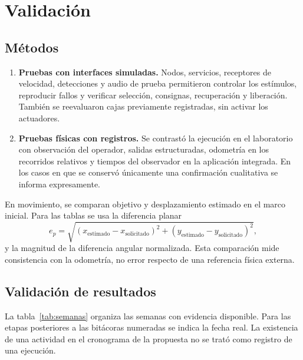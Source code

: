 \documentclass[11pt,letterpaper]{article}
\begin{document}
\FloatBarrier
\clearpage
\section{Validación}\label{sec:validacion}
\subsection{Métodos}
\begin{enumerate}
\item \textbf{Pruebas con interfaces simuladas.} Nodos, servicios, receptores de velocidad, detecciones y audio de prueba permitieron controlar los estímulos, reproducir fallos y verificar selección, consignas, recuperación y liberación. También se reevaluaron cajas previamente registradas, sin activar los actuadores.
\item \textbf{Pruebas físicas con registros.} Se contrastó la ejecución en el laboratorio con observación del operador, salidas estructuradas, odometría en los recorridos relativos y tiempos del observador en la aplicación integrada. En los casos en que se conservó únicamente una confirmación cualitativa se informa expresamente.
\end{enumerate}

En movimiento, se comparan objetivo y desplazamiento estimado en el marco inicial. Para las tablas se usa la diferencia planar
\begin{equation}
e_p = \sqrt{(x_{\mathrm{estimado}}-x_{\mathrm{solicitado}})^2+(y_{\mathrm{estimado}}-y_{\mathrm{solicitado}})^2},
\end{equation}
y la magnitud de la diferencia angular normalizada. Esta comparación mide consistencia con la odometría, no error respecto de una referencia física externa.

\subsection{Validación de resultados}
La tabla~\ref{tab:semanas} organiza las semanas con evidencia disponible. Para las etapas posteriores a las bitácoras numeradas se indica la fecha real. La existencia de una actividad en el cronograma de la propuesta no se trató como registro de una ejecución.
\end{document}
